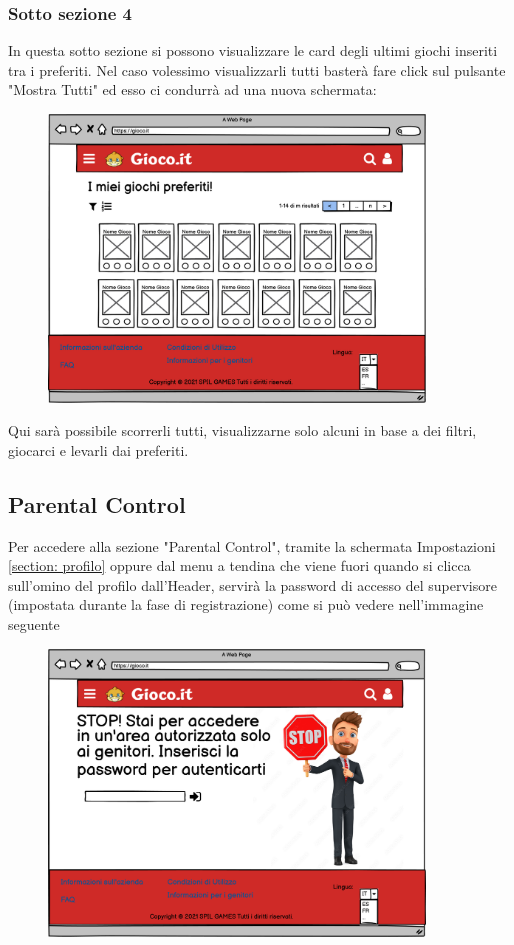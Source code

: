 \documentclass[../Report.tex]{subfiles}
\begin{document}
    \subsubsection{Sotto sezione 4}
    In questa sotto sezione si possono visualizzare le card degli ultimi giochi inseriti tra i preferiti. Nel caso volessimo visualizzarli tutti basterà fare click sul pulsante "Mostra Tutti" ed esso ci condurrà ad una nuova schermata:
    \begin{figure}[H]
        \includegraphics[width=10cm]{WPreferiti.png}
        \centering
    \end{figure}
    Qui sarà possibile scorrerli tutti, visualizzarne solo alcuni in base a dei filtri, giocarci e levarli dai preferiti.

    \subsection{Parental Control}
    \label{section: parental control}
    Per accedere alla sezione "Parental Control", tramite la schermata Impostazioni \ref{section: profilo} oppure dal menu a tendina che viene fuori quando si clicca sull'omino del profilo dall'Header, servirà la password di accesso del supervisore (impostata durante la fase di registrazione) come si può vedere nell'immagine seguente
    \begin{figure}[H]
        \includegraphics[width=10cm]{WParentalControlAcces.png}
        \centering
    \end{figure}
\end{document}
